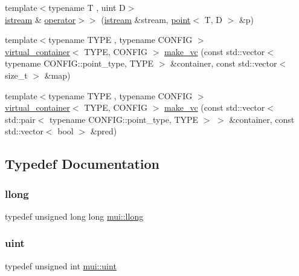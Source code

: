 \begin{DoxyCompactItemize}
\begin{DoxyCompactList}
 \end{DoxyCompactList}\item 
{\footnotesize template$<$typename T , uint D$>$ }\\\hyperlink{classmui_1_1istream}{istream} \& \hyperlink{namespacemui_abcee4d382903f03011151ffca9acd369}{operator$>$$>$} (\hyperlink{classmui_1_1istream}{istream} \&stream, \hyperlink{structmui_1_1point}{point}$<$ T, D $>$ \&p)
\item 
{\footnotesize template$<$typename T\+Y\+PE , typename C\+O\+N\+F\+IG $>$ }\\\hyperlink{classmui_1_1virtual__container}{virtual\+\_\+container}$<$ T\+Y\+PE, C\+O\+N\+F\+IG $>$ \hyperlink{namespacemui_a8c0452b30fd8fcca78b5d6c407e6658f}{make\+\_\+vc} (const std\+::vector$<$ typename C\+O\+N\+F\+I\+G\+::point\+\_\+type, T\+Y\+PE $>$ \&container, const std\+::vector$<$ size\+\_\+t $>$ \&map)
\item 
{\footnotesize template$<$typename T\+Y\+PE , typename C\+O\+N\+F\+IG $>$ }\\\hyperlink{classmui_1_1virtual__container}{virtual\+\_\+container}$<$ T\+Y\+PE, C\+O\+N\+F\+IG $>$ \hyperlink{namespacemui_ab66112b8a8cf6fa0ce4200ca87d40434}{make\+\_\+vc} (const std\+::vector$<$ std\+::pair$<$ typename C\+O\+N\+F\+I\+G\+::point\+\_\+type, T\+Y\+PE $>$ $>$ \&container, const std\+::vector$<$ bool $>$ \&pred)
\end{DoxyCompactItemize}


\subsection{Typedef Documentation}
\mbox{\label{namespacemui_acdd7d9ab9b53650d3c9faa4aa3320d7f}} 
\subsubsection{\texorpdfstring{llong}{llong}}
{\footnotesize\ttfamily typedef unsigned long long \hyperlink{namespacemui_acdd7d9ab9b53650d3c9faa4aa3320d7f}{mui\+::llong}}

\mbox{\label{namespacemui_af15a3e7188a2117fb9965277bb0cacd2}} 
\subsubsection{\texorpdfstring{uint}{uint}}
{\footnotesize\ttfamily typedef unsigned int \hyperlink{namespacemui_af15a3e7188a2117fb9965277bb0cacd2}{mui\+::uint}}

